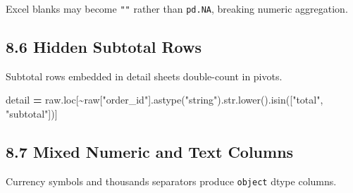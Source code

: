 \documentclass[
  12pt,
]{article}
\newenvironment{Shaded}{\begin{snugshade}}{\end{snugshade}}
\newcommand{\BuiltInTok}[1]{#1}
\newcommand{\ControlFlowTok}[1]{\textcolor[rgb]{0.13,0.29,0.53}{\textbf{#1}}}
\newcommand{\DecValTok}[1]{\textcolor[rgb]{0.00,0.00,0.81}{#1}}
\newcommand{\KeywordTok}[1]{\textcolor[rgb]{0.13,0.29,0.53}{\textbf{#1}}}
\newcommand{\NormalTok}[1]{#1}
\newcommand{\OperatorTok}[1]{\textcolor[rgb]{0.81,0.36,0.00}{\textbf{#1}}}
\newcommand{\PreprocessorTok}[1]{\textcolor[rgb]{0.56,0.35,0.01}{\textit{#1}}}
\newcommand{\StringTok}[1]{\textcolor[rgb]{0.31,0.60,0.02}{#1}}
\newcommand{\VariableTok}[1]{\textcolor[rgb]{0.00,0.00,0.00}{#1}}
\newcommand{\VerbatimStringTok}[1]{\textcolor[rgb]{0.31,0.60,0.02}{#1}}
\begin{document}
Excel blanks may become \texttt{""} rather than \texttt{pd.NA}, breaking
numeric aggregation.

\begin{Shaded}
\end{Shaded}

\subsection{8.6 Hidden Subtotal Rows}\label{hidden-subtotal-rows}

Subtotal rows embedded in detail sheets double-count in pivots.

\begin{Shaded}
\begin{Highlighting}[]
\NormalTok{detail }\OperatorTok{=}\NormalTok{ raw.loc[}\OperatorTok{\textasciitilde{}}\NormalTok{raw[}\StringTok{"order\_id"}\NormalTok{].astype(}\StringTok{"string"}\NormalTok{).}\BuiltInTok{str}\NormalTok{.lower().isin([}\StringTok{"total"}\NormalTok{, }\StringTok{"subtotal"}\NormalTok{])]}
\end{Highlighting}
\end{Shaded}

\subsection{8.7 Mixed Numeric and Text
Columns}\label{mixed-numeric-and-text-columns}

Currency symbols and thousands separators produce \texttt{object} dtype
columns.

\begin{Shaded}
\end{Shaded}
\end{document}
